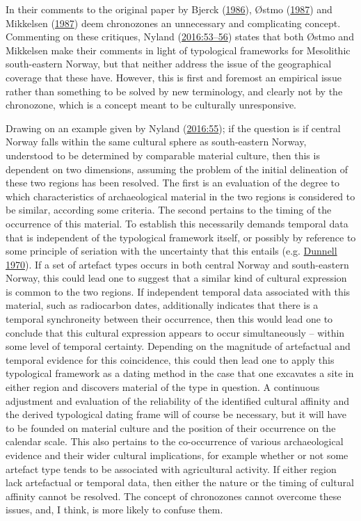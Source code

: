 \documentclass[
  12pt,
  a4paper,
  oneside]{book}
\begin{document}
In their comments to the original paper by Bjerck (\protect\hyperlink{ref-bjerck1986}{1986}), Østmo (\protect\hyperlink{ref-uxf8stmo1987}{1987}) and Mikkelsen (\protect\hyperlink{ref-mikkelsen1987}{1987}) deem chronozones an unnecessary and complicating concept. Commenting on these critiques, Nyland (\protect\hyperlink{ref-nyland2016}{2016:53--56}) states that both Østmo and Mikkelsen make their comments in light of typological frameworks for Mesolithic south-eastern Norway, but that neither address the issue of the geographical coverage that these have. However, this is first and foremost an empirical issue rather than something to be solved by new terminology, and clearly not by the chronozone, which is a concept meant to be culturally unresponsive.

Drawing on an example given by Nyland (\protect\hyperlink{ref-nyland2016}{2016:55}); if the question is if central Norway falls within the same cultural sphere as south-eastern Norway, understood to be determined by comparable material culture, then this is dependent on two dimensions, assuming the problem of the initial delineation of these two regions has been resolved. The first is an evaluation of the degree to which characteristics of archaeological material in the two regions is considered to be similar, according some criteria. The second pertains to the timing of the occurrence of this material. To establish this necessarily demands temporal data that is independent of the typological framework itself, or possibly by reference to some principle of seriation with the uncertainty that this entails (e.g. \protect\hyperlink{ref-dunnell1970}{Dunnell 1970}). If a set of artefact types occurs in both central Norway and south-eastern Norway, this could lead one to suggest that a similar kind of cultural expression is common to the two regions. If independent temporal data associated with this material, such as radiocarbon dates, additionally indicates that there is a temporal synchroneity between their occurrence, then this would lead one to conclude that this cultural expression appears to occur simultaneously -- within some level of temporal certainty. Depending on the magnitude of artefactual and temporal evidence for this coincidence, this could then lead one to apply this typological framework as a dating method in the case that one excavates a site in either region and discovers material of the type in question. A continuous adjustment and evaluation of the reliability of the identified cultural affinity and the derived typological dating frame will of course be necessary, but it will have to be founded on material culture and the position of their occurrence on the calendar scale. This also pertains to the co-occurrence of various archaeological evidence and their wider cultural implications, for example whether or not some artefact type tends to be associated with agricultural activity. If either region lack artefactual or temporal data, then either the nature or the timing of cultural affinity cannot be resolved. The concept of chronozones cannot overcome these issues, and, I think, is more likely to confuse them.
\end{document}
